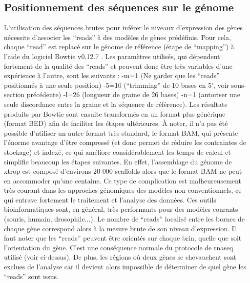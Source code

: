 \documentclass[../main.tex]{subfiles}
\begin{document}
	\subsection{Positionnement des séquences sur le génome}
		L'utilisation des séquences brutes pour inférer le niveaux d'expression des gènes nécessite d'associer les ``reads'' à des modèles de gènes prédéfinis.
		Pour cela, chaque ``read'' est replacé sur le génome de référence (étape de ``mapping'') à l'aide du logiciel Bowtie v0.12.7 \citep{Langmead2009}. Les paramètres utilisés, qui dépendent fortement de la qualité des ``reads'' et peuvent donc être très variables d'une expérience à l'autre, sont les suivants : -m=1 (Ne garder que les ``reads'' positionnés à une seule position) -5=10 (``trimming'' de 10 bases en 5', voir sous-section précédente) -l=26 (longueur de graine de 26 bases) -n=1 (autoriser une seule discordance entre la graine et la séquence de référence).
		Les résultats produits par Bowtie sont ensuite transformés en un format plus générique (format BED) afin de faciliter les étapes ultérieures.
		À noter, il n'a pas été possible d'utiliser un autre format très standard, le format BAM, qui présente l'énorme avantage d'être compressé (et donc permet de réduire les contraintes de stockage) et indexé, ce qui améliore considérablement les temps de calcul et simplifie beaucoup les étapes suivantes.
		En effet, l'assemblage du génome de \gls{xtrop} est composé d'environs 20 000 scaffolds alors que le format BAM ne peut en accommoder qu'une centaine.
		Ce type de complication est malheureusement très courant dans les approches génomiques des modèles non conventionnels, ce qui entrave fortement le traitement et l'analyse des données.
		Ces outils bioinformatiques sont, en général, très performants pour des modèles courants (souris, humain, drosophile...).
		Le nombre de ``reads'' localisé entre les bornes de chaque gène correspond alors à la mesure brute de son niveau d'expression.
		Il faut noter que les ``reads'' peuvent être orientés sur chaque brin, quelle que soit l'orientation du gène.
		C'est une conséquence normale du protocole de \gls{rnaseq} utilisé (voir ci-dessus).
		De plus, les régions où deux gènes se chevauchent sont exclues de l'analyse car il devient alors impossible de déterminer de quel gène les ``reads'' sont issus.
\end{document}
